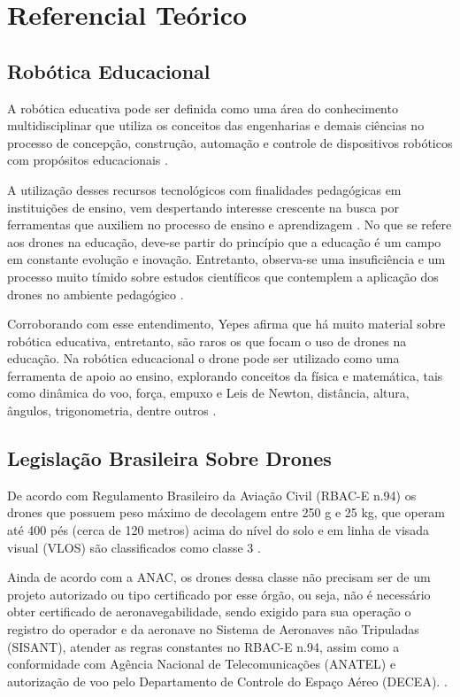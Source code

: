 \documentclass[conference]{IEEEtran}
\begin{document}
\section{Referencial Teórico}

\subsection{Robótica Educacional}

A robótica educativa pode ser definida como uma área do conhecimento multidisciplinar que utiliza os conceitos das engenharias e demais ciências no processo de concepção, construção, automação e controle de dispositivos robóticos com propósitos educacionais \cite{b1}.

A utilização desses recursos tecnológicos com finalidades pedagógicas em instituições de ensino, vem despertando interesse crescente na busca por ferramentas que auxiliem no processo de ensino e aprendizagem \cite{b12}. No que se refere aos drones na educação, deve-se partir do princípio que a educação é um campo em constante evolução e inovação. Entretanto, observa-se uma insuficiência e um processo muito tímido sobre estudos científicos que contemplem a aplicação dos drones no ambiente pedagógico \cite{b9}.

Corroborando com esse entendimento, Yepes \cite{b11} afirma que há muito material sobre robótica educativa, entretanto, são raros os que focam o uso de drones na educação.  Na robótica educacional o drone pode ser utilizado como uma ferramenta de apoio ao ensino, explorando conceitos da física e matemática, tais como dinâmica do voo, força, empuxo e Leis de Newton, distância, altura, ângulos, trigonometria, dentre outros \cite{b11}.

\subsection{Legislação Brasileira Sobre Drones}

De acordo com Regulamento Brasileiro da Aviação Civil (RBAC-E n.94) os drones que possuem peso máximo de decolagem entre 250 g e 25 kg, que operam até 400 pés (cerca de 120 metros) acima do nível do solo e em linha de visada visual (VLOS) são classificados como classe 3 \cite{b2}.

Ainda de acordo com a ANAC, os drones dessa classe não precisam ser de um projeto autorizado ou tipo certificado por esse órgão, ou seja, não é necessário obter certificado de aeronavegabilidade, sendo exigido para sua operação o registro do operador e da aeronave no Sistema de Aeronaves não Tripuladas (SISANT), atender as regras constantes no RBAC-E n.94, assim como a conformidade com Agência Nacional de Telecomunicações (ANATEL) e autorização de voo pelo Departamento de Controle do Espaço Aéreo (DECEA).
\cite{b2}.
\end{document}
